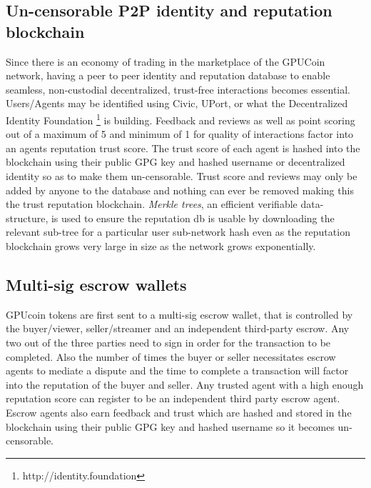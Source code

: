 \documentclass{article}
\begin{document}
\subsection{Un-censorable P2P identity and reputation blockchain}
Since there is an economy of trading in the marketplace of the GPUCoin network, having a peer to peer identity and reputation database to enable seamless, non-custodial decentralized, trust-free interactions becomes essential. Users/Agents may be identified using Civic, UPort, or what the Decentralized Identity Foundation \footnote{http://identity.foundation} is building. Feedback and reviews as well as point scoring out of a maximum of 5 and minimum of 1 for quality of interactions factor into an agents reputation trust score. The trust score of each agent is hashed into the blockchain using their public GPG key and hashed username or decentralized identity so as to make them un-censorable. Trust score and reviews may only be added by anyone to the database and nothing can ever be removed making this the trust reputation blockchain. \emph{Merkle trees}, an efficient verifiable data-structure, is used to ensure the reputation db is usable by downloading the relevant sub-tree for a particular user sub-network hash even as the reputation blockchain grows very large in size as the network grows exponentially.

\subsection{Multi-sig escrow wallets}
GPUcoin tokens are first sent to a multi-sig escrow wallet, that is controlled by the buyer/viewer, seller/streamer and an independent third-party escrow. Any two out of the three parties need to sign in order for the transaction to be completed. Also the number of times the buyer or seller necessitates escrow agents to mediate a dispute and the time to complete a transaction will factor into the reputation of the buyer and seller. Any trusted agent with a high enough reputation score can register to be an independent third party escrow agent. Escrow agents also earn feedback and trust which are hashed and stored in the blockchain using their public GPG key and hashed username so it becomes un-censorable.
\end{document}
